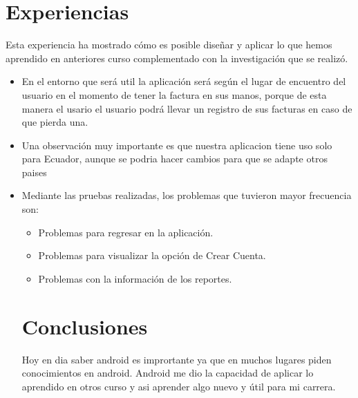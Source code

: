 \section{ Experiencias}
 Esta experiencia ha mostrado cómo es posible diseñar y aplicar lo que hemos aprendido en anteriores curso complementado con la investigación que se realizó.
\begin{itemize}
\item En el entorno que será util la aplicación será según el lugar de encuentro del usuario en el momento de tener la factura en sus manos, porque de esta manera el usario el usuario podrá llevar un registro de sus facturas en caso de que pierda una.
\item Una observación muy importante es que nuestra aplicacion tiene uso solo para Ecuador, aunque se podria hacer cambios para  que se adapte otros paises 
\item Mediante las pruebas realizadas, los problemas que tuvieron  mayor frecuencia son:
  \begin{itemize}
\item Problemas para regresar en la aplicación.
\item Problemas para visualizar la opción de Crear Cuenta.
\item Problemas con  la información de los reportes.
   \end{itemize}
\section{ Conclusiones}
 Hoy en dia saber android es imprortante ya que en muchos lugares piden conocimientos en android. Android me dio la capacidad de aplicar lo aprendido en otros curso y asi aprender algo nuevo y útil para mi carrera. 

\end{itemize}



